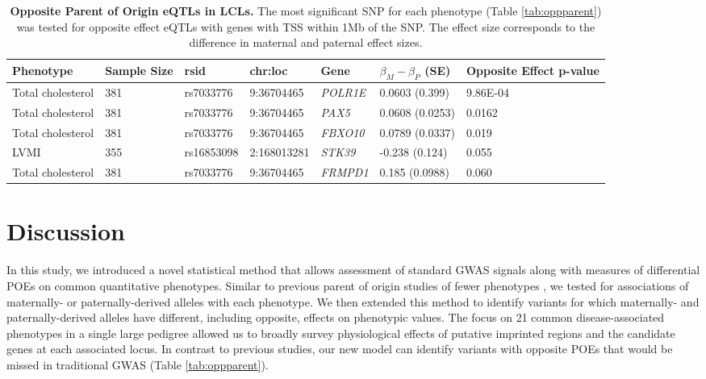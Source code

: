 \begin{table}
\centering
\begin{adjustbox}{width={\textwidth}}
\begin{tabular}{@{}p{3cm}|p{2cm}p{2cm}p{2cm}p{2.5cm}p{2cm}p{2cm}@{}}
\toprule Phenotype & Sample Size & rsid & chr:loc & Gene & $\beta_{M}-\beta_{P}$ (SE) & Opposite Effect p-value  \\ \midrule
Total cholesterol & 381 & rs7033776	 & 9:36704465	 &\emph{POLR1E} & 	0.0603 (0.399) & 9.86E-04\\ \hline
Total cholesterol & 381 & rs7033776	 & 9:36704465	 &\emph{PAX5} & 	0.0608 (0.0253) & 	0.0162\\ \hline
Total cholesterol & 381 & rs7033776	 & 9:36704465	 &\emph{FBXO10} & 	0.0789 (0.0337) & 	0.019\\ \hline
LVMI	 & 355 & rs16853098 & 2:168013281 	 & \emph{STK39}	 &-0.238 (0.124) & 	0.055\\ \hline
Total cholesterol & 381 & rs7033776 & 	9:36704465 & 	\emph{FRMPD1} & 	0.185 (0.0988) & 	0.060 \\ \bottomrule
\end{tabular}
\end{adjustbox}
\caption[Opposite Parent of Origin eQTLs in LCLs. ]{\textbf{Opposite Parent of Origin eQTLs in LCLs.} The most significant SNP for each phenotype (Table \ref{tab:oppparent}) was tested for opposite effect eQTLs with genes with TSS within 1Mb of the SNP. The effect size corresponds to the difference in maternal and paternal effect sizes.}
\label{tab:oppgexp}
\end{table}



\section{Discussion}\label{ch02-discussion}

In this study, we introduced a novel statistical method that allows assessment of standard GWAS signals along with measures of differential POEs on common quantitative phenotypes. Similar to previous parent of origin studies of fewer phenotypes \cite{Kong:2009kk,Benonisdottir:2016dz,Garg2012a}, we tested for associations of maternally- or paternally-derived alleles with each phenotype. We then extended this method to identify variants for which maternally- and paternally-derived alleles have different, including opposite, effects on phenotypic values. The focus on 21 common disease-associated phenotypes in a single large pedigree allowed us to broadly survey physiological effects of putative imprinted regions and the candidate genes at each associated locus. In contrast to previous studies, our new model can identify variants with opposite POEs that would be missed in traditional GWAS (Table \ref{tab:oppparent}). 

